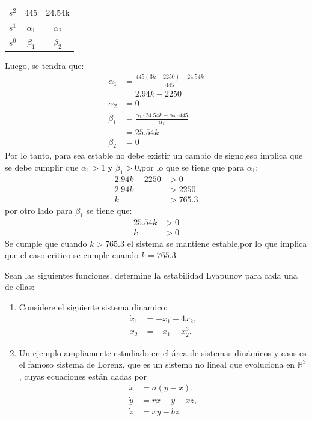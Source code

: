 \documentclass[
  11pt,
  letterpaper,
   addpoints,
   answers
  ]{exam}
\begin{document}
\begin{questions}
\begin{solution}
\begin{center}
\begin{tabular}{|c|c|c|}
            $s^{2}$ & 445 & 24.54k\\
            $s^{1}$ & $\alpha_{1}$ & $\alpha_{2}$\\
            $s^{0}$ & $\beta_{1}$ & $\beta_{2}$\\
            \hline
        \end{tabular}
    \end{center}
    Luego, se tendra que:
    \begin{align}
        \alpha_{1} &= \frac{445(3k-2250) - 24.54k}{445}\\
                   &= 2.94k - 2250\\
        \alpha_{2} &= 0\\
        \beta_{1}  &= \frac{\alpha_{1} \cdot 24.54k - \alpha_{2}\cdot 445}{\alpha_{1}}\\
                   &= 25.54k\\
        \beta_{2}  &=0
    \end{align}
    Por lo tanto, para sea estable no debe existir un cambio de signo,eso implica que se debe cumplir que $\alpha_{1}>1$ y $\beta_{1}>0$,por lo que se tiene que para $\alpha_{1}$:
    \begin{align}
        2.94k - 2250 &> 0\\
        2.94k &> 2250\\
        k &> 765.3
    \end{align}
    por otro lado para $\beta_{1}$ se tiene que:
    \begin{align}
        25.54k &> 0\\
        k &> 0
    \end{align}
    Se cumple que cuando $k>765.3$ el sistema se mantiene estable,por lo que implica que el caso critico se cumple cuando $k=765.3$.
\end{solution}
\question Sean las siguientes funciones, determine la estabilidad Lyapunov para cada una de ellas:
\begin{enumerate}
    \item Considere el siguiente sistema dinamico: 
    \begin{align}
        \dot{x}_1 &= -x_1 + 4x_2, \\
        \dot{x}_2 &= -x_1 - x_2^3.
    \end{align}
    \item Un ejemplo ampliamente estudiado en el área de sistemas dinámicos y caos es el famoso sistema de Lorenz, que es un sistema no lineal que evoluciona en \( \mathbb{R}^3 \), cuyas ecuaciones están dadas por
    \begin{align}
        \dot{x} &= \sigma (y - x), \\
        \dot{y} &= r x - y - x z, \\
        \dot{z} &= x y - b z.
    \end{align}
    

\end{enumerate}
\end{questions}
\end{document}
